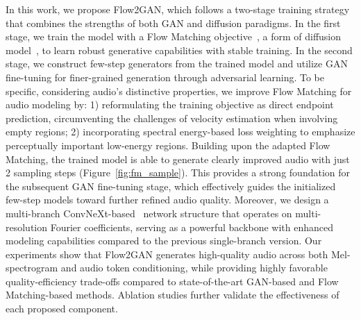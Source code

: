 In this work, we propose Flow2GAN, which follows a two-stage training strategy that combines the strengths of both GAN and diffusion paradigms. In the first stage, we train the model with a Flow Matching objective~\citep{fm1,fm2}, a form of diffusion model~\citep{kingma2023understanding}, to learn robust generative capabilities with stable training. In the second stage, we construct few-step generators from the trained model and utilize GAN fine-tuning for finer-grained generation through adversarial learning. 
To be specific, considering audio's distinctive properties, we improve Flow Matching for audio modeling by: 1) reformulating the training objective as direct endpoint prediction, circumventing the challenges of velocity estimation when involving empty regions; 2) incorporating spectral energy-based loss weighting to emphasize perceptually important low-energy regions. 
Building upon the adapted Flow Matching, the trained model is able to generate clearly improved audio with just 2 sampling steps (Figure~\ref{fig:fm_sample}). This provides a strong foundation for the subsequent GAN fine-tuning stage, which effectively guides the initialized few-step models toward further refined audio quality. Moreover, we design a multi-branch ConvNeXt-based~\citep{convnext} network structure that operates on multi-resolution Fourier coefficients, serving as a powerful backbone with enhanced modeling capabilities compared to the previous single-branch version. 
Our experiments show that Flow2GAN generates high-quality audio across both Mel-spectrogram and audio token conditioning, while providing highly favorable quality-efficiency trade-offs compared to state-of-the-art GAN-based and Flow Matching-based methods.
Ablation studies further validate the effectiveness of each proposed component. 



